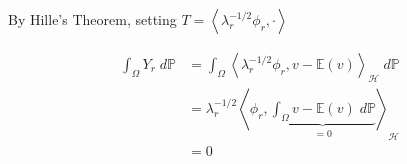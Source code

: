 \documentclass{article}
\numberwithin{theorem}{section}
\numberwithin{lemma}{section}
\numberwithin{definition}{section}
\numberwithin{assumption}{section}
\numberwithin{proposition}{section}
\numberwithin{remark}{section}
\numberwithin{corollary}{section}
\numberwithin{conjecture}{section}
\numberwithin{example}{section}
\newcommand{\E}{\mathbb{E}}
\newcommand{\bset}[1]{\left \lbrace #1 \right \rbrace}
\newcommand{\aset}[1]{\left \langle #1 \right \rangle}
\newcommand{\Span}[1]{\mathrm{Span}\bset{#1}}
\newcommand{\D}{\displaystyle}
\newcommand{\intp}[1] {\D \int_\Omega {#1 } \; d \mathbb P}
\begin{document}
\begin{multicols*}{2}
By Hille's Theorem, setting $T = \aset{\lambda_r^{-1/2} \phi_r, \cdot}$

\begin{align*}
\intp{Y_r} &= 
\intp{\aset{\lambda_r^{-1/2}\phi_r, v - \E(v)}_\mathcal H}
\\&= \lambda_r^{-1/2} \aset{\phi_r,  
\underbrace{
\intp{
v - \E(v)
}
}_{= 0}
}_\mathcal H 
\\&= 0 
\end{align*}

\end{multicols*}
\end{document}
